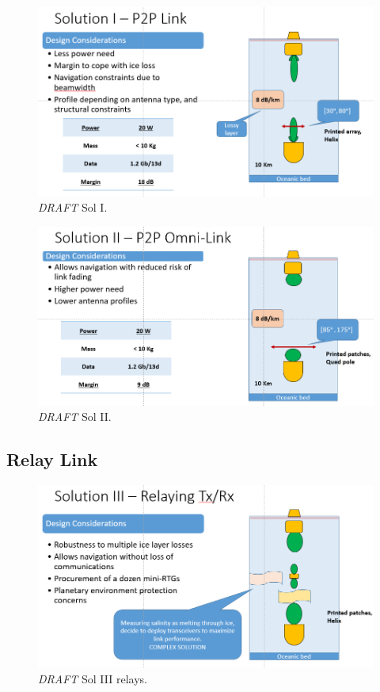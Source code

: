 
\begin{figure}[htb]
	\centering
	\includegraphics[width=\textwidth]{figures/comms/iceLink-p2p-HighD}
	\caption{ \textit{DRAFT} Sol I.}
	\label{fig:iceLink-p2p-HighD}
\end{figure}

%

\begin{figure}[htb]
	\centering
	\includegraphics[width=\textwidth]{figures/comms/iceLink-p2p-LowD}
	\caption{ \textit{DRAFT} Sol II.}
	\label{fig:iceLink-p2p-LowD}
\end{figure}

\subsection{Relay Link}
\begin{figure}[htb]
	\centering
	\includegraphics[width=\textwidth]{figures/comms/iceLink-relay}
	\caption{ \textit{DRAFT} Sol III relays.}
	\label{fig:iceLink-relay}
\end{figure}